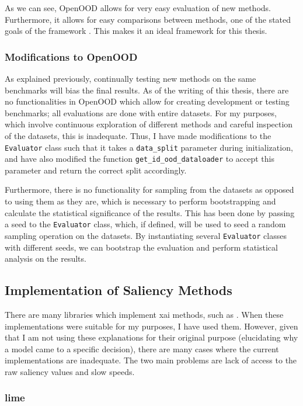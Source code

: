 \documentclass[UKenglish]{uiomasterthesis} %
\theoremstyle{definition}
\begin{document}
As we can see, OpenOOD allows for very easy evaluation of new methods. Furthermore, it allows for easy comparisons between methods, one of the stated goals of the framework \cite{openood}. This makes it an ideal framework for this thesis.


\subsubsection{Modifications to OpenOOD}

As explained previously, continually testing new methods on the same benchmarks will bias the final results. As of the writing of this thesis, there are no functionalities in OpenOOD which allow for creating development or testing benchmarks; all evaluations are done with entire datasets. For my purposes, which involve continuous exploration of different methods and careful inspection of the datasets, this is inadequate. Thus, I have made modifications to the \texttt{Evaluator} class such that it takes a \texttt{data\_split} parameter during initialization, and have also modified the function \texttt{get\_id\_ood\_dataloader} to accept this parameter and return the correct split accordingly.

Furthermore, there is no functionality for sampling from the datasets as opposed to using them as they are, which is necessary to perform bootstrapping and calculate the statistical significance of the results. This has been done by passing a seed to the \texttt{Evaluator} class, which, if defined, will be used to seed a random sampling operation on the datasets. By instantiating several \texttt{Evaluator} classes with different seeds, we can bootstrap the evaluation and perform statistical analysis on the results.

\subsection{Implementation of Saliency Methods}

There are many libraries which implement \ac{xai} methods, such as \cite{lime, captum, jacobgilpytorchcam}. When these implementations were suitable for my purposes, I have used them. However, given that I am not using these explanations for their original purpose (elucidating why a model came to a specific decision), there are many cases where the current implementations are inadequate. The two main problems are lack of access to the raw saliency values and slow speeds.

\subsubsection{\ac{lime}}
\end{document}
